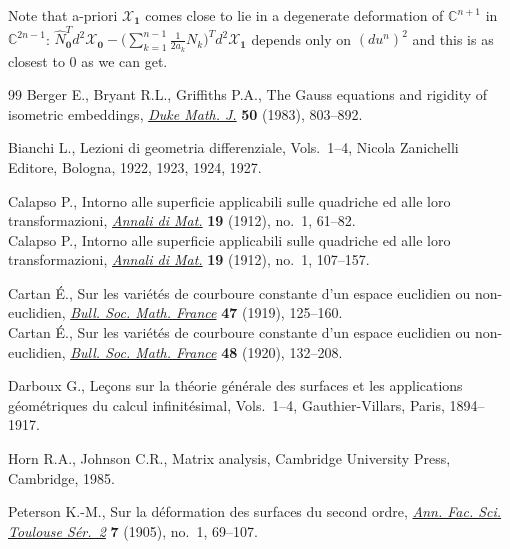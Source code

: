 \documentclass[11pt]{article}
\begin{document}
\begin{remark}
Note that a-priori $\mathcal{X}_{\mathbf{1}}$ comes close to lie
in a degenerate deformation of $\mathbb{C}^{n+1}$ in
$\mathbb{C}^{2n-1}$:  $\hat
N_{\mathbf{0}}^Td^2\mathcal{X}_{\mathbf{0}}-
\big(\sum\limits_{k=1}^{n-1}\frac{1}{2a_k}N_k\big)^Td^2\mathcal{X}_{\mathbf{1}}$
depends only on $(du^n)^2$ and this is as closest to $0$ as we can
get.
\end{remark}
\begin{thebibliography}{99}
Berger E., Bryant R.L., Grif\/f\/iths P.A.,
The Gauss equations and rigidity of isometric embeddings,
\href{http://dx.doi.org/10.1215/S0012-7094-83-05039-1}{{\it Duke Math. J.}} {\bf 50} (1983), 803--892.

Bianchi  L.,
Lezioni di geometria dif\/ferenziale, Vols.~1--4, Nicola Zanichelli Editore, Bologna, 1922, 1923, 1924, 1927.

Calapso  P.,
Intorno alle superf\/icie applicabili sulle quadriche ed alle loro transformazioni,
\href{http://dx.doi.org/10.1007/BF02419392}{{\it Annali di Mat.}} {\bf 19}  (1912), no.~1, 61--82.\\
Calapso  P.,
Intorno alle superf\/icie applicabili sulle quadriche ed alle loro transformazioni,
\href{http://dx.doi.org/10.1007/BF02419394}{{\it Annali di Mat.}} {\bf 19}  (1912), no.~1, 107--157.

Cartan \'E.,
Sur les vari\'{e}t\'{e}s de courboure constante d'un espace euclidien ou non-euclidien,
\href{http://www.numdam.org/item?id=BSMF_1919__47__125_1}{{\it Bull. Soc. Math. France}} {\bf 47} (1919), 125--160.\\
Cartan \'E.,
Sur les vari\'{e}t\'{e}s de courboure constante d'un espace euclidien ou non-euclidien,
\href{http://www.numdam.org/item?id=BSMF_1920__48__132_1}{{\it Bull. Soc. Math. France}} {\bf 48} (1920), 132--208.

Darboux G.,
Le\c{c}ons sur la th\'{e}orie g\'{e}n\'{e}rale des surfaces et les applications g\'eom\'etriques du calcul inf\/init\'esimal, Vols.~1--4, Gauthier-Villars, Paris, 1894--1917.

Horn  R.A., Johnson C.R.,
Matrix analysis, Cambridge University Press, Cambridge, 1985.

 Peterson  K.-M., Sur la d\'{e}formation des surfaces du second ordre,
\href{http://afst.cedram.org/afst-bin/item?id=AFST_1905_2_7_1_69_0}{{\it Ann. Fac.  Sci. Toulouse S\'{e}r.~2\/}} {\bf 7}  (1905), no.~1, 69--107.

\end{thebibliography}
\end{document}
